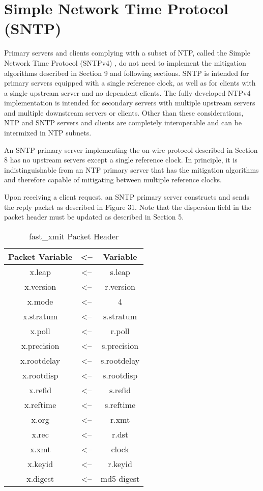 \chapter{Simple Network Time Protocol (SNTP)}

Primary servers and clients complying with a subset of NTP, called
the Simple Network Time Protocol (SNTPv4) \cite{RFC4330}, do not need to
implement the mitigation algorithms described in Section 9 and
following sections.  SNTP is intended for primary servers equipped
with a single reference clock, as well as for clients with a single
upstream server and no dependent clients.  The fully developed NTPv4
implementation is intended for secondary servers with multiple
upstream servers and multiple downstream servers or clients.  Other
than these considerations, NTP and SNTP servers and clients are
completely interoperable and can be intermixed in NTP subnets.

An SNTP primary server implementing the on-wire protocol described in
Section 8 has no upstream servers except a single reference clock.
In principle, it is indistinguishable from an NTP primary server that
has the mitigation algorithms and therefore capable of mitigating
between multiple reference clocks.

Upon receiving a client request, an SNTP primary server constructs
and sends the reply packet as described in Figure 31.  Note that the
dispersion field in the packet header must be updated as described in
Section 5.

\begin{table}[htb]
\center
\begin{tabular}{c | c | c}
Packet Variable & <-- & Variable \\
\hline
\hline
x.leap      & <-- & s.leap      \\
x.version   & <-- & r.version   \\
x.mode      & <-- & 4           \\
x.stratum   & <-- & s.stratum   \\
x.poll      & <-- & r.poll      \\
x.precision & <-- & s.precision \\
x.rootdelay & <-- & s.rootdelay \\
x.rootdisp  & <-- & s.rootdisp  \\
x.refid     & <-- & s.refid     \\
x.reftime   & <-- & s.reftime   \\
x.org       & <-- & r.xmt       \\
x.rec       & <-- & r.dst       \\
x.xmt       & <-- & clock       \\
x.keyid     & <-- & r.keyid     \\
x.digest    & <-- & md5 digest  \\
\hline
\end{tabular}
\label{fast_xmit_packet_header}
\caption{fast\_xmit Packet Header}
\end{table}

